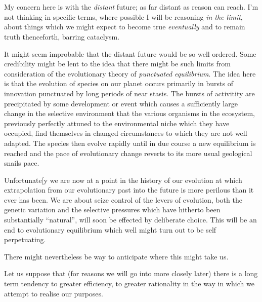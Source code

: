 \chapter{}

My concern here is with the {\it distant} future; as far distant as reason can reach.
I'm not thinking in specific terms, where possible I will be reasoning {\it in the limit}, about things which we might expect to become true {\it eventually} and to remain truth thenceforth, barring cataclysm.

It might seem improbable that the distant future would be so well ordered.
Some credibility might be lent to the idea that there might be such limits from consideration of the evolutionary theory of {\it punctuated equilibrium}.
The idea here is that the evolution of species on our planet occurs primarily in bursts of innovation punctuated by long periods of near stasis.
The bursts of activitity are precipitated by some development or event which causes a sufficiently large change in the selective environment that the various organisms in the ecosystem, previously perfectly attuned to the environmental niche which they have occupied, find themselves in changed circumstances to which they are not well adapted.
The species then evolve rapidly until in due course a new equilibrium is reached and the pace of evolutionary change reverts to its more usual geological snails pace.

Unfortunate[y we are now at a point in the history of our evolution at which extrapolation from our evolutionary past into the future is more perilous than it ever has been.
We are about seize control of the levers of evolution, both the genetic variation and the selective pressures which have hitherto been substantially ``natural'', will soon be effected by deliberate choice.
This will be an end to evolutionary equilibrium which well might turn out to be self perpetuating.

There might nevertheless be way to anticipate where this might take us.

Let us suppose that (for reasons we will go into more closely later) there is a long term tendency to greater efficiency,
to greater rationality in the way in which we attempt to realise our purposes.





\backmatter




\clearpage

\clearpage

\twocolumn[
]
{\small\printindex}

\vfil


